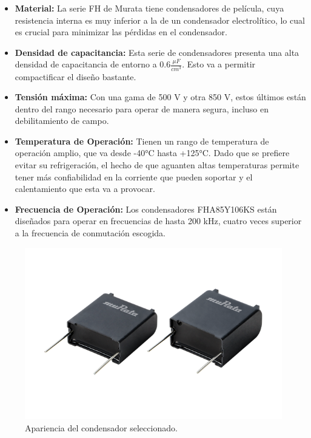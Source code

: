 \begin{itemize}
	\item \textbf{Material:} La serie FH de Murata tiene condensadores de película, cuya resistencia interna es muy inferior a la de un condensador electrolítico, lo cual es crucial para minimizar las pérdidas en el condensador.
	
	\item \textbf{Densidad de capacitancia:} Esta serie de condensadores presenta una alta densidad de capacitancia de entorno a $0.6\frac{\mu F}{cm^3}$. Esto va a permitir compactificar el diseño bastante.
	
	\item \textbf{Tensión máxima:} Con una gama de 500 V y otra 850 V, estos últimos están dentro del rango necesario para operar de manera segura, incluso en debilitamiento de campo.
	
	\item \textbf{Temperatura de Operación:} Tienen un rango de temperatura de operación amplio, que va desde -40°C hasta +125°C. Dado que se prefiere evitar su refrigeración, el hecho de que aguanten altas temperaturas permite tener más confiabilidad en la corriente que pueden soportar y el calentamiento que esta va a provocar.
	
	\item \textbf{Frecuencia de Operación:} Los condensadores FHA85Y106KS están diseñados para operar en frecuencias de hasta 200 kHz, cuatro veces superior a la frecuencia de conmutación escogida.
	
	
\end{itemize}

\begin{figure}[H]
	\centering
	\includegraphics[width=0.7\linewidth]{fig/FHA85Y106KS}
	\caption{Apariencia del condensador seleccionado.}
\end{figure}


